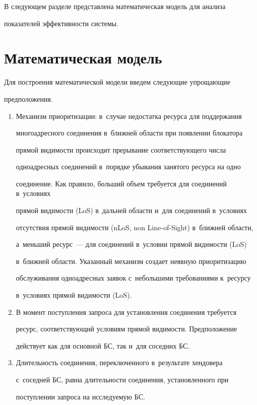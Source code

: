   В следующем разделе представлена математическая модель для анализа 

показателей эффективности сис\-темы.



\section{Математическая модель}



  Для построения математической модели введем сле\-ду\-ющие упро\-ща\-ющие 

предположения. 

  \begin{enumerate}[1.]

\item   Механизм приоритизации: в~случае недостатка ресурса для поддержания 

многоадресного соединения в~ближ\-ней об\-ласти при появлении блокатора 

прямой ви\-ди\-мости происходит прерывание соответствующего чис\-ла 

одноадресных соединений в~порядке убывания занятого ресурса на одно 

соединение. Как правило, больший объем требуется для соединений в~условиях 

прямой ви\-ди\-мости (LoS) в~дальней об\-ласти и~для соединений в~условиях 

отсутствия прямой ви\-ди\-мости (nLoS, non Line-of-Sight) в~ближ\-ней об\-ласти, 

а~меньший ресурс~--- для соединений в~условии прямой ви\-ди\-мости (LoS) 

в~ближ\-ней об\-ласти. Указанный механизм создает неявную приоритизацию 

обслуживания одноадресных заявок с~небольшими требованиями к~ресурсу 

в~условиях прямой ви\-ди\-мости (LoS).

\item В момент поступления запроса для установления соединения требуется 

ресурс, со\-от\-вет\-ст\-ву\-ющий условиям прямой ви\-ди\-мости. Предположение 

действует как для основ\-ной БС, так и~для соседних БС.

\item Длительность соединения, переключенного в~результате хендовера 

с~соседней БС, рав\-на дли\-тель\-ности со\-еди\-не\-ния, уста\-нов\-лен\-но\-го при 

по\-ступ\-ле\-нии запроса на ис\-сле\-ду\-емую БС.

\end{enumerate}



